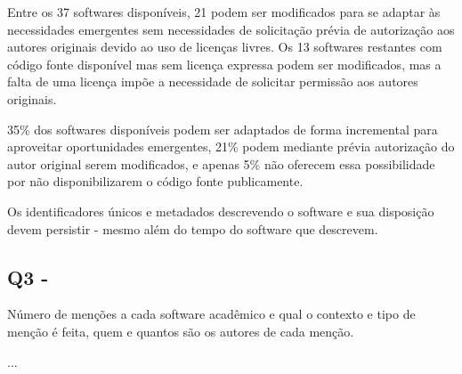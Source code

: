 Entre os 37 softwares disponíveis, 21 podem ser modificados para se adaptar às
necessidades emergentes sem necessidades de solicitação prévia de autorização
aos autores originais devido ao uso de licenças livres. 
Os 13 softwares restantes com código fonte disponível mas sem licença expressa podem
ser modificados, mas a falta de uma licença impõe a necessidade
de solicitar permissão aos autores originais.

35\% dos softwares disponíveis podem ser adaptados de forma incremental para
aproveitar oportunidades emergentes, 21\% podem mediante prévia autorização do
autor original serem modificados, e apenas 5\% não oferecem essa possibilidade
por não disponibilizarem o código fonte publicamente.


Os identificadores únicos e metadados descrevendo o software e sua disposição
devem persistir - mesmo além do tempo do software que descrevem.



\subsection{Q3 - \EstudoDoisQuestaoTres}

Número de menções a cada software acadêmico e qual o contexto e tipo de menção
é feita, quem e quantos são os autores de cada menção.

...

